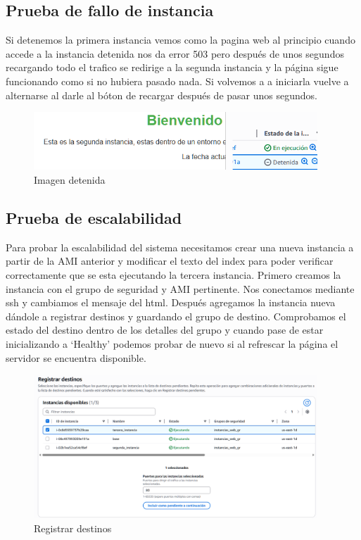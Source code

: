 \documentclass{article}
\begin{document}
\subsection{Prueba de fallo de instancia}
	Si detenemos la primera instancia vemos como la pagina web al principio cuando accede a la instancia detenida nos da error 503 pero después de unos segundos recargando todo el trafico se redirige a la segunda instancia y la página sigue funcionando como si no hubiera pasado nada. Si volvemos a a iniciarla vuelve a alternarse al darle al bóton de recargar después de pasar unos segundos.

	\begin{figure}[H]
	\centering
	\includegraphics[width=0.95\textwidth]{imagen_detenida.png}
	\caption{Imagen detenida}
	\end{figure}

\newpage

\subsection{Prueba de escalabilidad}

	Para probar la escalabilidad del sistema necesitamos crear una nueva instancia a partir de la AMI anterior y modificar el texto del index para poder verificar correctamente que se esta ejecutando la tercera instancia. Primero creamos la instancia con el grupo de seguridad y AMI pertinente. Nos conectamos mediante ssh y cambiamos el mensaje del html. Después agregamos la instancia nueva dándole a registrar destinos y guardando el grupo de destino. Comprobamos el estado del destino dentro de los detalles del grupo y cuando pase de estar inicializando a `Healthy' podemos probar de nuevo si al refrescar la página el servidor se encuentra disponible.


	\begin{figure}[H]
	\centering
	\includegraphics[width=0.95\textwidth]{registrar_destinos.png}
	\caption{Registrar destinos}
	\end{figure}
\end{document}
